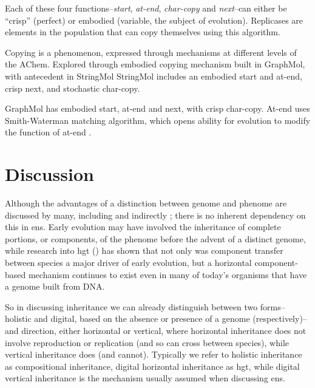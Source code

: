 \begin{NOTES}
Each of these four functions--\emph{start}, \emph{at-end}, \emph{char-copy} and \emph{next}--can either be ``crisp'' (\ie perfect) or embodied (variable, the subject of evolution). Replicases are elements in the population that can copy themselves using this algorithm.

Copying is a phenomenon, expressed through mechanisms at different levels of the AChem. Explored through embodied copying mechanism built in GraphMol, with antecedent in StringMol \parencite{Hickinbotham2011}
StringMol includes an embodied start and at-end, crisp next, and stochastic char-copy. 

GraphMol has embodied start, at-end and next, with crisp char-copy. At-end uses Smith-Waterman matching algorithm, which opens ability for evolution to modify the function of at-end \parencite[p.143]{Nellis2012}. 
\end{NOTES}

\section{Discussion}
Although the advantages of a distinction between genome and phenome are discussed by many, including \parencite[section 7.2.3]{Taylor1999} and indirectly \cite{VonNeumann1966}; there is no inherent dependency on this in \gls{ens}. Early evolution may have involved the inheritance of complete portions, or components, of the phenome before the advent of a distinct genome, while research into \gls{hgt} (\eg \cite{Ochman2000,Pace:2008vi,Ragan2009}) has shown that not only was component transfer between species a major driver of early evolution, but a horizontal component-based mechanism continues to exist even in many of today's organisms that have a genome built from DNA. 

So in discussing inheritance we can already distinguish between two forms--holistic and digital, based on the absence or presence of a genome (respectively)--and direction, either horizontal or vertical, where horizontal inheritance does not involve reproduction or replication (and so can cross between species), while vertical inheritance does (and cannot). Typically we refer to holistic inheritance as compositional inheritance, digital horizontal inheritance as \gls{hgt},  while digital vertical inheritance is the mechanism usually assumed when discussing \gls{ens}.

